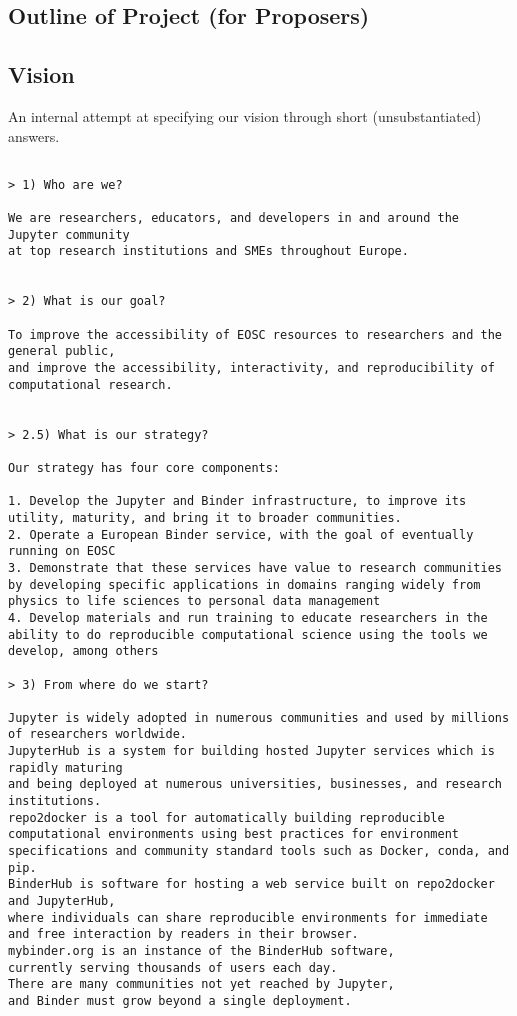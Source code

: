 \begin{draft}
\section*{Outline of Project (for Proposers)}


\subsection*{Vision}

An internal attempt at specifying our vision through short
(unsubstantiated) answers.

\begin{verbatim}

> 1) Who are we?

We are researchers, educators, and developers in and around the Jupyter community
at top research institutions and SMEs throughout Europe.


> 2) What is our goal?

To improve the accessibility of EOSC resources to researchers and the general public,
and improve the accessibility, interactivity, and reproducibility of computational research.


> 2.5) What is our strategy?

Our strategy has four core components:

1. Develop the Jupyter and Binder infrastructure, to improve its utility, maturity, and bring it to broader communities.
2. Operate a European Binder service, with the goal of eventually running on EOSC
3. Demonstrate that these services have value to research communities by developing specific applications in domains ranging widely from physics to life sciences to personal data management
4. Develop materials and run training to educate researchers in the ability to do reproducible computational science using the tools we develop, among others

> 3) From where do we start?

Jupyter is widely adopted in numerous communities and used by millions of researchers worldwide.
JupyterHub is a system for building hosted Jupyter services which is rapidly maturing
and being deployed at numerous universities, businesses, and research institutions.
repo2docker is a tool for automatically building reproducible computational environments using best practices for environment specifications and community standard tools such as Docker, conda, and pip.
BinderHub is software for hosting a web service built on repo2docker and JupyterHub,
where individuals can share reproducible environments for immediate and free interaction by readers in their browser.
mybinder.org is an instance of the BinderHub software,
currently serving thousands of users each day.
There are many communities not yet reached by Jupyter,
and Binder must grow beyond a single deployment.



\end{verbatim}
\end{draft}
